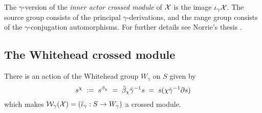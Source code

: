 The $\gamma$-version of the \emph{inner actor crossed module} of $\mathcal{X}$ 
is the image $\iota_{\gamma}\mathcal{X}$. 
The source group consists of the principal $\gamma$-derivations, 
and the range group consists of the $\gamma$-conjugation automorphisms. 
For further details see Norrie's thesis \cite{norrie-thesis}. 



\subsection{The Whitehead crossed module} 
\label{subs:Whitehead-xmod}

\bigskip
\begin{lem} \label{lem:deriv-act}
There is an action of the Whitehead group $W_{\gamma}$ on $S$ given by
$$
s^{\chi} \;:=\; s^{\beta_{\chi}} 
          \;=\; \ddot{\beta}_{\chi} \ddot{\gamma}^{-1} s
          \;=\; s(\chi\dot{\gamma}^{-1}\partial s)
$$
which makes  $\mathcal{W}_{\gamma}(\mathcal{X}) = (\ddot{\iota}_{\gamma} : S \to W_{\gamma})$  
a crossed module.
\end{lem}
